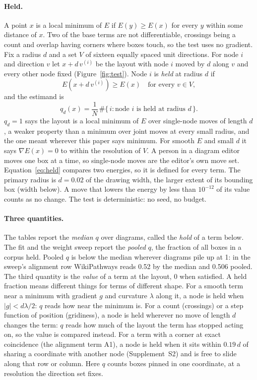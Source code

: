 \documentclass[11pt]{article}
\begin{document}
\paragraph{Held.} A point $x$ is a local minimum of $E$ if $E(y) \ge E(x)$ for every $y$
within some distance of $x$. Two of the base terms are not differentiable, crossings
being a count and overlap having corners where boxes touch, so the test uses no gradient.
Fix a radius $d$ and a set $V$ of sixteen equally spaced unit directions. For node $i$
and direction $v$ let $x + d\,v^{(i)}$ be the layout with node $i$ moved by $d$ along $v$
and every other node fixed (Figure~\ref{fig:test}). Node $i$ is \emph{held} at radius $d$
if
\begin{equation}
E(x + d\,v^{(i)}) \ge E(x) \quad \text{for every } v \in V,
\label{eq:held}
\end{equation}
and the estimand is
\begin{equation}
q_d(x) = \frac{1}{N}\,\#\{\,i : \text{node } i \text{ is held at radius } d\,\}.
\label{eq:q}
\end{equation}
$q_d = 1$ says the layout is a local minimum of $E$ over single-node moves of length $d$,
a weaker property than a minimum over joint moves at every small radius, and the one
meant wherever this paper says minimum. For smooth $E$ and small $d$ it says $\nabla E(x)
= 0$ to within the resolution of $V$. A person in a diagram editor moves one box at a
time, so single-node moves are the editor's own move set. Equation~\eqref{eq:held}
compares two energies, so it is defined for every term. The primary radius is $d = 0.02$
of the drawing width, the larger extent of its bounding box (width below). A move that
lowers the energy by less than $10^{-12}$ of its value counts as no change. The test is deterministic: no seed, no budget.

\paragraph{Three quantities.} The tables report the \emph{median $q$} over diagrams,
called the \emph{hold} of a term below. The fit and the weight sweep report the
\emph{pooled $q$}, the fraction of all boxes in a corpus held. Pooled $q$ is below the
median wherever diagrams pile up at 1: in the sweep's alignment row WikiPathways reads
0.52 by the median and 0.506 pooled. The third quantity is the \emph{value} of a term at
the layout, 0 when satisfied. A held fraction means different
things for terms of different shape. For a smooth term near a minimum with gradient $g$
and curvature $\lambda$ along it, a node is held when $|g| < d\lambda/2$: $q$ reads how
near the minimum is. For a count (crossings) or a step function of position (gridiness),
a node is held wherever no move of length $d$ changes the term: $q$ reads how much of the
layout the term has stopped acting on, so the value is compared instead. For a term with
a corner at exact coincidence (the alignment term A1), a node is held when it sits within
$0.19\,d$ of sharing a coordinate with another node (Supplement~S2) and is free to slide
along that row or column. Here $q$ counts boxes pinned in one coordinate, at a resolution
the direction set fixes.
\end{document}
